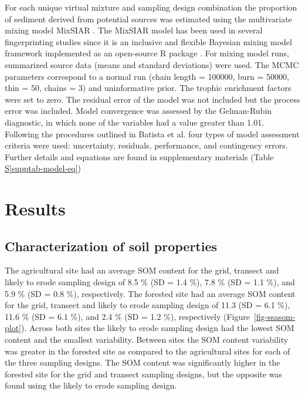 \documentclass[
  number]{elsarticle}
\newcommand*\quartosupptabref[1]{Table \hyperref[#1]{S\ref{#1}}}
\begin{document}
For each unique virtual mixture and sampling design combination the
proportion of sediment derived from potential sources was estimated
using the multivariate mixing model MixSIAR \citep[MixSIAR v
3.1.12][]{stock2016}. The MixSIAR model has been used in several
fingerprinting studies since it is an inclusive and flexible Bayesian
mixing model framework implemented as an open-source R package
\citep{stock2016a}. For mixing model runs, summarized source data (means
and standard deviations) were used. The MCMC parameters correspond to a
normal run (chain length = 100000, burn = 50000, thin = 50, chains = 3)
and uninformative prior. The trophic enrichment factors were set to
zero. The residual error of the model was not included but the process
error was included. Model convergence was assessed by the Gelman-Rubin
diagnostic, in which none of the variables had a value greater than
1.01. Following the procedures outlined in Batista et al.
\citep{batista2022} four types of model assessment criteria were used:
uncertainty, residuals, performance, and contingency errors. Further
details and equations are found in supplementary materials
(\quartosupptabref{supptab-model-eq})

\section{Results}\label{results}

\subsection{Characterization of soil
properties}\label{characterization-of-soil-properties}

The agricultural site had an average SOM content for the grid, transect
and likely to erode sampling design of 8.5 \% (SD = 1.4 \%), 7.8 \% (SD
= 1.1 \%), and 5.9 \% (SD = 0.8 \%), respectively. The forested site had
an average SOM content for the grid, transect and likely to erode
sampling design of 11.3 (SD = 6.1 \%), 11.6 \% (SD = 6.1 \%), and 2.4 \%
(SD = 1.2 \%), respectively (Figure~\ref{fig-ssasom-plot}). Across both
sites the likely to erode sampling design had the lowest SOM content and
the smallest variability. Between sites the SOM content variability was
greater in the forested site as compared to the agricultural sites for
each of the three sampling designs. The SOM content was significantly
higher in the forested site for the grid and transect sampling designs,
but the opposite was found using the likely to erode sampling design.
\end{document}
